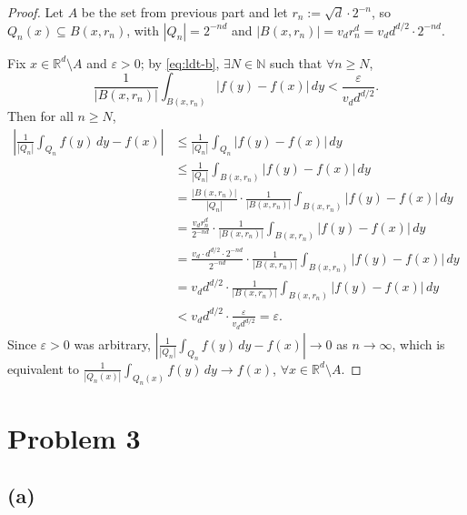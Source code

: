 \documentclass[12pt]{article}
\begin{document}
\begin{proof}
Let $A$ be the set from previous part and let $r_n := \sqrt{d}\cdot 2^{-n}$, so $Q_n(x) \subseteq B(x,r_n)$,
with $|Q_n| = 2^{-nd}$ and $|B(x,r_n)| = v_d r_n^d = v_d d^{d/2} \cdot 2^{-nd}$.

Fix $x \in \mathbb{R}^d \setminus A$ and $\varepsilon > 0$; by \eqref{eq:ldt-b}, $\exists N \in \mathbb{N}$ such that $\forall n \geq N$,
\[
  \frac{1}{|B(x,r_n)|}\int_{B(x,r_n)}|f(y)-f(x)|\,dy < \frac{\varepsilon}{v_d d^{d/2}}.
\]
Then for all $n \geq N$,
\begin{align*}
  \left|\frac{1}{|Q_n|}\int_{Q_n} f(y)\,dy - f(x)\right|
  &\leq \frac{1}{|Q_n|}\int_{Q_n}|f(y)-f(x)|\,dy \\
  &\leq \frac{1}{|Q_n|}\int_{B(x,r_n)}|f(y)-f(x)|\,dy \\
  &= \frac{|B(x,r_n)|}{|Q_n|}\cdot\frac{1}{|B(x,r_n)|}\int_{B(x,r_n)}|f(y)-f(x)|\,dy \\
  &= \frac{v_d r_n^d}{2^{-nd}}\cdot\frac{1}{|B(x,r_n)|}\int_{B(x,r_n)}|f(y)-f(x)|\,dy \\
  &= \frac{v_d \cdot d^{d/2} \cdot 2^{-nd}}{2^{-nd}}\cdot\frac{1}{|B(x,r_n)|}\int_{B(x,r_n)}|f(y)-f(x)|\,dy \\
  &= v_d d^{d/2}\cdot\frac{1}{|B(x,r_n)|}\int_{B(x,r_n)}|f(y)-f(x)|\,dy \\
  &< v_d d^{d/2}\cdot \frac{\varepsilon}{v_d d^{d/2}} = \varepsilon.
\end{align*}
Since $\varepsilon > 0$ was arbitrary, $\left|\frac{1}{|Q_n|}\int_{Q_n} f(y)\,dy - f(x)\right| \to 0$ as $n\to\infty$,
which is equivalent to $\frac{1}{|Q_n(x)|}\int_{Q_n(x)} f(y)\,dy \to f(x)$, $\forall x \in \mathbb{R}^d \setminus A$.
\end{proof}

\section*{Problem 3}

\subsection*{(a)}
\end{document}
